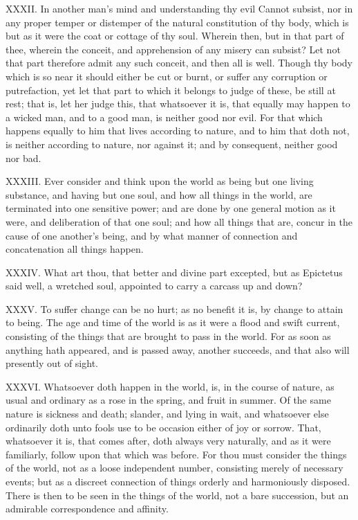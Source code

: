 XXXII. In another man's mind and understanding thy evil Cannot subsist,
nor in any proper temper or distemper of the natural constitution of thy
body, which is but as it were the coat or cottage of thy soul. Wherein
then, but in that part of thee, wherein the conceit, and apprehension of
any misery can subsist? Let not that part therefore admit any such
conceit, and then all is well. Though thy body which is so near it should
either be cut or burnt, or suffer any corruption or putrefaction, yet let
that part to which it belongs to judge of these, be still at rest; that
is, let her judge this, that whatsoever it is, that equally may happen to
a wicked man, and to a good man, is neither good nor evil. For that which
happens equally to him that lives according to nature, and to him that
doth not, is neither according to nature, nor against it; and by
consequent, neither good nor bad.

XXXIII. Ever consider and think upon the world as being but one living
substance, and having but one soul, and how all things in the world, are
terminated into one sensitive power; and are done by one general motion as
it were, and deliberation of that one soul; and how all things that are,
concur in the cause of one another's being, and by what manner of
connection and concatenation all things happen.

XXXIV. What art thou, that better and divine part excepted, but as
Epictetus said well, a wretched soul, appointed to carry a carcass up and
down?

XXXV. To suffer change can be no hurt; as no benefit it is, by change to
attain to being. The age and time of the world is as it were a flood and
swift current, consisting of the things that are brought to pass in the
world. For as soon as anything hath appeared, and is passed away, another
succeeds, and that also will presently out of sight.

XXXVI. Whatsoever doth happen in the world, is, in the course of nature,
as usual and ordinary as a rose in the spring, and fruit in summer. Of the
same nature is sickness and death; slander, and lying in wait, and
whatsoever else ordinarily doth unto fools use to be occasion either of
joy or sorrow. That, whatsoever it is, that comes after, doth always very
naturally, and as it were familiarly, follow upon that which was before.
For thou must consider the things of the world, not as a loose independent
number, consisting merely of necessary events; but as a discreet
connection of things orderly and harmoniously disposed. There is then to
be seen in the things of the world, not a bare succession, but an
admirable correspondence and affinity.

